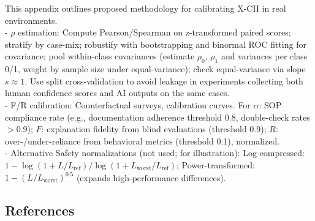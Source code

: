 \documentclass[a4paper]{article}
\begin{document}
This appendix outlines proposed methodology for calibrating X-CII in
real environments.\\
- $\rho$ estimation: Compute Pearson/Spearman on z-transformed paired scores;
stratify by case-mix; robustify with bootstrapping and binormal ROC
fitting for covariance; pool within-class covariances (estimate $\rho_0$, $\rho_1$
and variances per class 0/1, weight by sample size under
equal-variance); check equal-variance via slope $s \approx1$. Use split
cross-validation to avoid leakage in experiments collecting both human
confidence scores and AI outputs on the same cases.\\
- F/R calibration: Counterfactual surveys, calibration curves. For $\alpha$:
SOP compliance rate (e.g., documentation adherence threshold 0.8,
double-check rates $>$0.9); $F$: explanation fidelity from blind
evaluations (threshold 0.9); $R$: over-/under-reliance from behavioral
metrics (threshold 0.1), normalized.\\
- Alternative Safety normalizations (not used; for illustration):
Log-compressed: $1 - \log(1 + L/L_{\text{ref}})/\log(1 + L_{\text{worst}}/L_{\text{ref}})$;
Power-transformed: $1 - (L/L_{\text{worst}})^{0.5}$ (expands high-performance
differences).

\subsection{References}\label{references}
\end{document}
